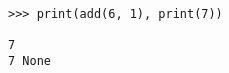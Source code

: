 \question \begin{lstlisting}
>>> print(add(6, 1), print(7))
\end{lstlisting}

\begin{solution}[0.5in]
\begin{verbatim}
7
7 None
\end{verbatim}
\end{solution}